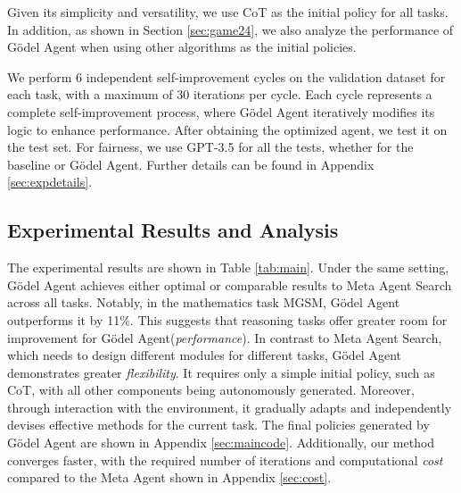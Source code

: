 \documentclass[11pt]{article}
\newcommand{\framework}{Gödel Agent\xspace}
\begin{document}
Given its simplicity and versatility, we use CoT as the initial policy for all tasks.
In addition, as shown in Section \ref{sec:game24}, we also analyze the performance of \framework when using other algorithms as the initial policies.




We perform 6 independent self-improvement cycles on the validation dataset for each task, with a maximum of 30 iterations per cycle. Each cycle represents a complete self-improvement process, where \framework iteratively modifies its logic to enhance performance.
After obtaining the optimized agent, we test it on the test set. For fairness, we use GPT-3.5 for all the tests, whether for the baseline or \framework{}.
Further details can be found in Appendix \ref{sec:expdetails}.


\subsection{Experimental Results and Analysis}
The experimental results are shown in Table \ref{tab:main}. Under the same setting, \framework achieves either optimal or comparable results to Meta Agent Search across all tasks. Notably, in the mathematics task MGSM, \framework outperforms it by 11\%. This suggests that reasoning tasks offer greater room for improvement for \framework (\textit{performance}). 
In contrast to Meta Agent Search, which needs to design different modules for different tasks, \framework demonstrates greater \textit{flexibility}. It requires only a simple initial policy, such as CoT, with all other components being autonomously generated. 
Moreover, through interaction with the environment, it gradually adapts and independently devises effective methods for the current task. The final policies generated by \framework are shown in Appendix \ref{sec:maincode}. Additionally, our method converges faster, with the required number of iterations and computational \textit{cost} compared to the Meta Agent shown in Appendix \ref{sec:cost}. 
\end{document}
